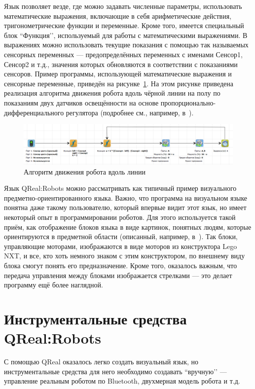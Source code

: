 \documentclass[a4paper]{article}
\begin{document}
{Язык позволяет везде, где можно задавать численные параметры, использовать математические выражения, включающие в себя арифметические действия, тригонометрические функции и переменные. Кроме того, имеется специальный блок ``Функция’’, используемый для работы с математическими выражениями. В выражениях можно использовать текущие показания с помощью так называемых сенсорных переменных --- предопределённых переменных с именами Сенсор1, Сенсор2 и т.д., значения которых обновляются в соответствии с показаниями сенсоров. Пример программы, использующей математические выражения и сенсорные переменные, приведён на рисунке~\ref{movingAlongTheLine}. На этом рисунке приведена реализация алгоритма движения робота вдоль чёрной линии на полу по показаниям двух датчиков освещённости на основе пропорционально-дифференциального регулятора (подробнее см., например, в~\cite{filippov}).

\begin{figure} [ht]
  \begin{center}
    \includegraphics[width=\textwidth]{movingAlongTheLine.png}
    \caption{Алгоритм движения робота вдоль линии}
    \label{movingAlongTheLine}
  \end{center}
\end{figure}

Язык QReal:Robots можно рассматривать как типичный пример визуального предметно-ориентированного языка. Важно, что программа на визуальном языке понятна даже такому пользователю, который впервые видит этот язык, но имеет некоторый опыт в программировании роботов. Для этого используется такой приём, как отображение блоков языка в виде картинок, понятных людям, которые ориентируются в предметной области (описанный, например, в~\cite{theBook}). Так блоки, управляющие моторами, изображаются в виде  моторов из конструктора Lego NXT, и все, кто хоть немного знаком с этим конструктором, по внешнему виду блока смогут понять его предназначение. Кроме того, оказалось важным, что передача управления между блоками изображается стрелками --- это делает программу ещё более наглядной.

\section{Инструментальные средства QReal:Robots}
С помощью QReal оказалось легко создать визуальный язык, но инструментальные средства для него необходимо создавать ``вручную’’ --- управление реальным роботом по Bluetooth, двухмерная модель робота и т.д. 


}
\end{document}
